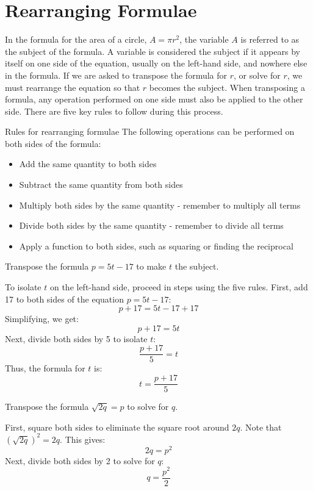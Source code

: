 \section{Rearranging Formulae}
In the formula for the area of a circle, \(A = \pi r^2\), the variable \(A\) is referred to as the subject of the formula. A variable is considered the subject if it appears by itself on one side of the equation, usually on the left-hand side, and nowhere else in the formula. If we are asked to transpose the formula for \(r\), or solve for \(r\), we must rearrange the equation so that \(r\) becomes the subject. When transposing a formula, any operation performed on one side must also be applied to the other side. There are five key rules to follow during this process.

\begin{custombox}{Rules for rearranging formulae}
The following operations can be performed on both sides of the formula:
\begin{itemize}
    \item Add the same quantity to both sides
    \item Subtract the same quantity from both sides
    \item Multiply both sides by the same quantity - remember to multiply all terms
    \item Divide both sides by the same quantity - remember to divide all terms
    \item Apply a function to both sides, such as squaring or finding the reciprocal
\end{itemize}
\end{custombox}

\begin{example} Transpose the formula \(p = 5t - 17\) to make \(t\) the subject.

\begin{solution}
 To isolate \(t\) on the left-hand side, proceed in steps using the five rules. First, add 17 to both sides of the equation \(p = 5t - 17\):
\[
p + 17 = 5t - 17 + 17
\]
Simplifying, we get:
\[
p + 17 = 5t
\]
Next, divide both sides by 5 to isolate \(t\):
\[
\frac{p + 17}{5} = t
\]
Thus, the formula for \(t\) is:
\[
t = \frac{p + 17}{5}
\]   
\end{solution}    
\end{example}

\begin{example} Transpose the formula \(\sqrt{2q} = p\) to solve for \(q\).

\begin{solution}
   First, square both sides to eliminate the square root around \(2q\). Note that \((\sqrt{2q})^2 = 2q\). This gives:
\[
2q = p^2
\]
Next, divide both sides by 2 to solve for \(q\):
\[
q = \frac{p^2}{2}
\]   
\end{solution}
 
\end{example}




